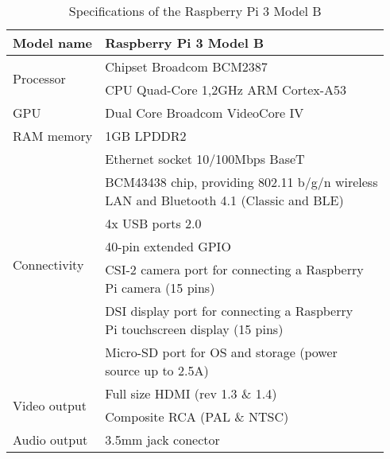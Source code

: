 	\renewcommand{\arraystretch}{1.3}
	\begin{table}[h!b]
		\centering
	    \begin{tabular}{| l | l |}
	    \hline
	    Model name & Raspberry Pi 3 Model B \\\hline
	    \multirow{2}{*}{Processor} & Chipset Broadcom BCM2387 \\ \cline{2-2}
                             	   & CPU Quad-Core 1,2GHz ARM Cortex-A53 \\\hline
		GPU & Dual Core Broadcom VideoCore IV \\\hline
		RAM memory & 1GB LPDDR2 \\\hline	    	    			
		\multirow{7}{*}{Connectivity} & Ethernet socket 10/100Mbps BaseT \\ \cline{2-2}
                             	   & \makecell[tl]{BCM43438 chip, providing 802.11 b/g/n wireless \\ LAN and Bluetooth 4.1 (Classic and BLE)} \\ \cline{2-2}
                             	   & 4x USB ports 2.0 \\ \cline{2-2}
                             	   & 40-pin extended GPIO \\ \cline{2-2}
                             	   & \makecell[tl]{CSI-2 camera port for connecting a Raspberry \\ Pi camera (15 pins)} \\ \cline{2-2}
                             	   & \makecell[tl]{DSI display port for connecting a Raspberry \\ Pi touchscreen display (15 pins)} \\ \cline{2-2}
                             	   & \makecell[tl]{Micro-SD port for OS and storage (power \\ source up to 2.5A)} \\\hline
        \multirow{2}{*}{Video output} & Full size HDMI (rev 1.3 \& 1.4) \\ \cline{2-2}
                             	   & Composite RCA (PAL \& NTSC) \\\hline
        Audio output & 3.5mm jack conector \\\hline
	    \end{tabular}
	    \caption{Specifications of the Raspberry Pi 3 Model B}
	    \label{table:rasp_pi_specs}
	\end{table}
	\renewcommand{\arraystretch}{1}

